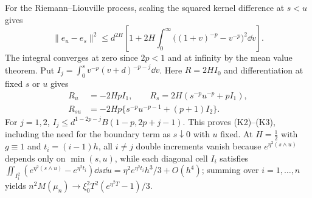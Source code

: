 For the Riemann--Liouville process, scaling the squared kernel difference at $s<u$ gives
\[
 \|e_u-e_s\|^2\le d^{2H}\left[1+2H\int_0^\infty
       \big((1+v)^{-p}-v^{-p}\big)^2\dd v\right].
\]
The integral converges at zero since $2p<1$ and at infinity by the mean value theorem.
Put $I_j=\int_0^s v^{-p}(v+d)^{-p-j}\dd v$.
Here $R=2HI_0$ and differentiation at fixed $s$ or $u$ gives
\[
\begin{aligned}
 R_u&=-2Hp I_1,\qquad R_s=2H(s^{-p}u^{-p}+p I_1),\\
 R_{su}&=-2Hp\{s^{-p}u^{-p-1}+(p+1)I_2\}.
\end{aligned}
\]
For $j=1,2$, $I_j\le d^{1-2p-j}B(1-p,2p+j-1)$.
This proves (K2)--(K3), including the need for the boundary term as $s\downarrow0$ with $u$ fixed.
At $H=\tfrac12$ with $g\equiv1$
and $t_i=(i-1)h$, all $i\ne j$ double increments vanish because $e^{\eta^2(s\wedge u)}$ depends only on
$\min(s,u)$, while each diagonal cell $I_i$ satisfies
$\iint_{I_i^2}(e^{\eta^2(s\wedge u)}-e^{\eta^2 t_i})\dd s\dd u=\eta^2 e^{\eta^2 t_i}h^3/3+O(h^4)$; summing
over $i=1,\dots,n$ yields $n^2 M(\mu_n)\to\xi_0^2 T^2(e^{\eta^2 T}-1)/3$.


